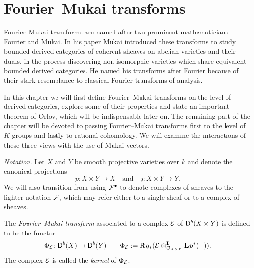 \section{Fourier--Mukai transforms}
\label{Chapter: Fourier-Mukai transforms}

Fourier--Mukai transforms are named after two prominent mathematicians -- Fourier and Mukai. 
In his paper \cite{Mukai1981} Mukai introduced these transforms to study bounded derived categories of coherent sheaves on abelian varieties and their duals, in the process discovering non-isomorphic varieties which share equivalent bounded derived categories. He named his transforms after Fourier because of their stark resemblance to classical Fourier transforms of analysis.

In this chapter we will first define Fourier--Mukai transforms on the level of derived categories, explore some of their properties and state an important theorem of Orlov, which will be indispensable later on. The remaining part of the chapter will be devoted to passing Fourier--Mukai transforms first to the level of $K$-groups and lastly to rational cohomology. We will examine the interactions of these three views with the use of Mukai vectors.

\noindent
\textsl{Notation.}
Let $X$ and $Y$ be smooth projective varieties over $k$ and denote the canonical projections 
\[
    p \colon X \times Y \to X \quad \text{and} \quad q \colon X \times Y \to Y.
\]
We will also transition from using $\F^\bullet$ to denote complexes of sheaves to the lighter notation $\F$, which may refer either to a single sheaf or to a complex of sheaves.

\begin{definition}
    The \emph{Fourier--Mukai transform} associated to a complex $\E$ of $\derb{X \times Y}$ is defined to be the functor
    \[
        \fm{\E} \colon \derb{X} \to \derb{Y} \qquad \fm{\E} := \rderived{}{q_*}(\derivedtensor{\E}{\lderived{}{p^*}(-)}{\struct{X \times Y}}).
    \]
    The complex $\E$ is called the \emph{kernel} of $\fm{\E}$.
\end{definition}

